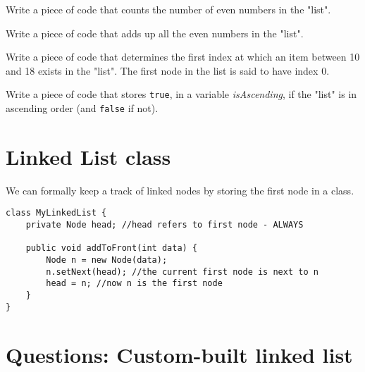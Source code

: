 \begin{questions}
\question Write a piece of code that counts the number of even numbers in the "list".

\question Write a piece of code that adds up all the even numbers in the "list".

\question Write a piece of code that determines the first index at which an item between 10 and 18 exists in the "list". The first node in the list is said to have index 0.

\question Write a piece of code that stores \texttt{true}, in a variable \textit{isAscending}, if the "list" is in ascending order (and \texttt{false} if not).
\end{questions}

\newpage

\section*{Linked List class}

We can formally keep a track of linked nodes by storing the first node in a class.

\begin{lstlisting}
class MyLinkedList {
	private Node head; //head refers to first node - ALWAYS
	
	public void addToFront(int data) {
		Node n = new Node(data);
		n.setNext(head); //the current first node is next to n
		head = n; //now n is the first node
	}
}
\end{lstlisting}

\section*{Questions: Custom-built linked list}

